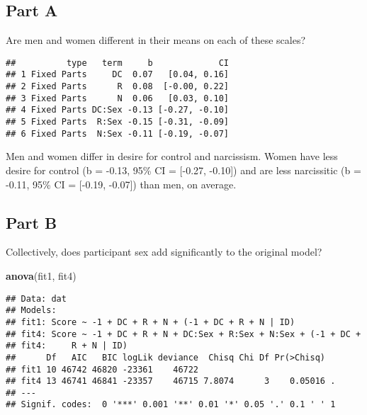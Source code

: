 \documentclass[]{article}
\newenvironment{Shaded}{\begin{snugshade}}{\end{snugshade}}
\newcommand{\KeywordTok}[1]{\textcolor[rgb]{0.13,0.29,0.53}{\textbf{#1}}}
\newcommand{\StringTok}[1]{\textcolor[rgb]{0.31,0.60,0.02}{#1}}
\newcommand{\OperatorTok}[1]{\textcolor[rgb]{0.81,0.36,0.00}{\textbf{#1}}}
\newcommand{\NormalTok}[1]{#1}
\begin{document}
\subsection{Part A}\label{part-a-1}

Are men and women different in their means on each of these scales?

\begin{Shaded}
\end{Shaded}

\begin{verbatim}
##          type   term     b             CI
## 1 Fixed Parts     DC  0.07   [0.04, 0.16]
## 2 Fixed Parts      R  0.08  [-0.00, 0.22]
## 3 Fixed Parts      N  0.06   [0.03, 0.10]
## 4 Fixed Parts DC:Sex -0.13 [-0.27, -0.10]
## 5 Fixed Parts  R:Sex -0.15 [-0.31, -0.09]
## 6 Fixed Parts  N:Sex -0.11 [-0.19, -0.07]
\end{verbatim}

Men and women differ in desire for control and narcissism. Women have
less desire for control (b = -0.13, 95\% CI = {[}-0.27, -0.10{]}) and
are less narcissitic (b = -0.11, 95\% CI = {[}-0.19, -0.07{]}) than men,
on average.

\subsection{Part B}\label{part-b-1}

Collectively, does participant sex add significantly to the original
model?

\begin{Shaded}
\begin{Highlighting}[]
\KeywordTok{anova}\NormalTok{(fit1, fit4)}
\end{Highlighting}
\end{Shaded}

\begin{verbatim}
## Data: dat
## Models:
## fit1: Score ~ -1 + DC + R + N + (-1 + DC + R + N | ID)
## fit4: Score ~ -1 + DC + R + N + DC:Sex + R:Sex + N:Sex + (-1 + DC + 
## fit4:     R + N | ID)
##      Df   AIC   BIC logLik deviance  Chisq Chi Df Pr(>Chisq)  
## fit1 10 46742 46820 -23361    46722                           
## fit4 13 46741 46841 -23357    46715 7.8074      3    0.05016 .
## ---
## Signif. codes:  0 '***' 0.001 '**' 0.01 '*' 0.05 '.' 0.1 ' ' 1
\end{verbatim}
\end{document}

